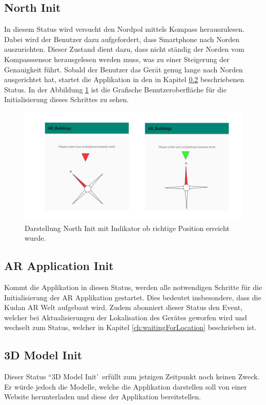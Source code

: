 \documentclass[a4paper]{scrreprt}
\begin{document}
\subsection{North Init} \label{ch:NorthInit}
In diesem Status wird versucht den Nordpol mittels Kompass herauszulesen. Dabei wird der Benutzer dazu aufgefordert, dass Smartphone nach Norden auszurichten. Dieser Zustand dient dazu, dass nicht ständig der Norden vom Kompasssensor herausgelesen werden muss, was zu einer Steigerung der Genauigkeit führt. Sobald der Benutzer das Gerät genug lange nach Norden ausgerichtet hat, startet die Applikation in den in Kapitel \ref{ch:ARApplicationInit} beschriebenen Status. In der Abbildung \ref{fig:NorthInitProcess} ist die Grafische Benutzeroberfläche für die Initialisierung dieses Schrittes zu sehen.
\begin{figure}[h!]
	\includegraphics[keepaspectratio, width=\textwidth]{NorthInitProcess.png}
	\caption{Darstellung North Init mit Indikator ob richtige Position erreicht wurde.}
    \label{fig:NorthInitProcess}
\end{figure}

\subsection{AR Application Init} \label{ch:ARApplicationInit}
Kommt die Applikation in diesen Status, werden alle notwendigen Schritte für die Initialisierung der AR Applikation gestartet. Dies bedeutet insbesondere, dass die Kudan AR Welt aufgebaut wird. Zudem abonniert dieser Status den Event, welcher bei Aktualisierungen der Lokalisation des Gerätes geworfen wird und wechselt zum Status, welcher in Kapitel \ref{ch:waitingForLocation} beschrieben ist.

\subsection{3D Model Init}
Dieser Status \textquotedblleft 3D Model Init\textquoteright\ erfüllt zum jetzigen Zeitpunkt noch keinen Zweck. Er würde jedoch die Modelle, welche die Applikation darstellen soll von einer Website herunterladen und diese der Applikation bereitstellen.
\end{document}
